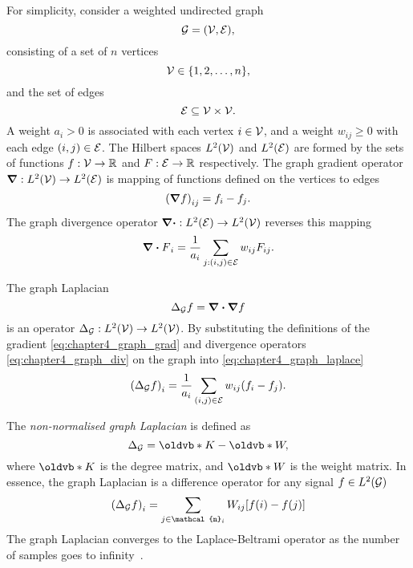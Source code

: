 For simplicity, consider a weighted undirected graph
%
\begin{equation}
	\mathcal{G}
	= (\mathcal{V}, \mathcal{E}),
\end{equation}
%
consisting of a set of \(n\) vertices
%
\begin{equation}
	\mathcal{V}
	\in \{1,2,\ldots,n\},
\end{equation}
%
and the set of edges
%
\begin{equation}
	\mathcal{E}
	\subseteq \mathcal{V} \times \mathcal{V}.
\end{equation}
%
A weight \(a_{i} > 0\) is associated with each vertex \(i \in \mathcal{V}{}\), and a weight \(w_{i j} \geq 0\) with each edge \((i,j) \in \mathcal{E}{}\).
The Hilbert spaces \(L^{2}(\mathcal{V})\) and \(L^{2}(\mathcal{E})\) are formed by the sets of functions \(f: \mathcal{V} \to \mathbb{R}\) and \(F: \mathcal{E} \to \mathbb{R}\) respectively.
The graph gradient operator \(\grad: L^{2}(\mathcal{V}) \to L^{2}(\mathcal{E})\) is mapping of functions defined on the vertices to edges
%
\begin{equation}\label{eq:chapter4_graph_grad}
	{(\grad{f})}_{i j}
	= f_{i} - f_{j}.
\end{equation}
%
The graph divergence operator \(\div: L^{2}(\mathcal{E}) \to L^{2}(\mathcal{V})\) reverses this mapping
%
\begin{equation}\label{eq:chapter4_graph_div}
	{\div{F}}_{i}
	= \frac{1}{a_{i}} \sum\limits_{j : (i,j) \in \mathcal{E}} w_{i j} F_{i j}.
\end{equation}

The graph Laplacian
%
\begin{equation}\label{eq:chapter4_graph_laplace}
	\Delta_{\mathcal{G}} f
	= \div{\grad{f}}
\end{equation}
%
is an operator \(\Delta_{\mathcal{G}} : L^{2}(\mathcal{V}) \to L^{2}(\mathcal{V})\).
By substituting the definitions of the gradient \cref{eq:chapter4_graph_grad} and divergence operators \cref{eq:chapter4_graph_div} on the graph into \cref{eq:chapter4_graph_laplace}
%
\begin{equation}
	{(\Delta_{\mathcal{G}} f)}_{i}
	= \frac{1}{a_{i}} \sum\limits_{(i,j) \in \mathcal{E}} w_{i j} (f_{i} - f_{j}).
\end{equation}

The \emph{non-normalised graph Laplacian} is defined as
%
\begin{equation}
	\laplace{G}
	= \vb{K} - \vb{W},
\end{equation}
%
where \(\vb{K}\) is the degree matrix, and \(\vb{W}\) is the weight matrix.
In essence, the graph Laplacian is a difference operator for any signal \(f \in L^{2}(\mathcal{G})\)
%
\begin{equation}
	{(\laplace{G} f)}_{i}
	= \sum\limits_{j \in \mathcal{n}_{i}} W_{i j} [f(i) - f(j)]
\end{equation}
%
The graph Laplacian converges to the Laplace-Beltrami operator as the number of samples goes to infinity~\cite{Belkin2007}.

